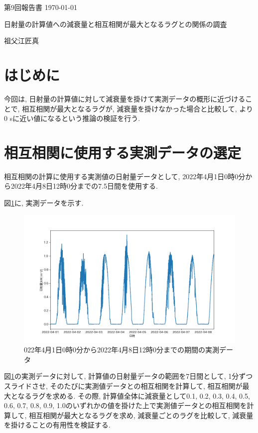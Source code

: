 \documentclass[a4j,12pt,]{jarticle}
\begin{document}
{\noindent\small 第9回報告書 \hfill\today}
\begin{center}
  {\Large 日射量の計算値への減衰量と相互相関が最大となるラグとの関係の調査}
\end{center}
\begin{flushright}
  祖父江匠真 \\
\end{flushright}

\section{はじめに}
今回は, 日射量の計算値に対して減衰量を掛けて実測データの概形に近づけることで, 相互相関が最大となるラグが, 減衰量を掛けなかった場合と比較して, より0 \si{\second}に近い値になるという推論の検証を行う.

\section{相互相関に使用する実測データの選定}
相互相関の計算に使用する実測値の日射量データとして, 2022年4月1日0時0分から2022年4月8日12時0分までの7.5日間を使用する.

図\ref{p1}に, 実測データを示す.

\begin{figure}[H]
  \begin{center}
    \includegraphics[width=160mm]{1.png}
    \caption{022年4月1日0時0分から2022年4月8日12時0分までの期間の実測データ}
    \label{p1}
  \end{center}
\end{figure}

図\ref{p1}の実測データに対して, 計算値の日射量データの範囲を7日間として, 1分ずつスライドさせ, そのたびに実測値データとの相互相関を計算して, 相互相関が最大となるラグを求める.
その際, 計算値全体に減衰量として0.1, 0.2, 0.3, 0.4, 0.5, 0.6, 0.7, 0.8, 0.9, 1.0のいずれかの値を掛けた上で実測値データとの相互相関を計算して, 相互相関が最大となるラグを求め, 減衰量ごとのラグを比較して, 減衰量を掛けることの有用性を検証する.
\end{document}
